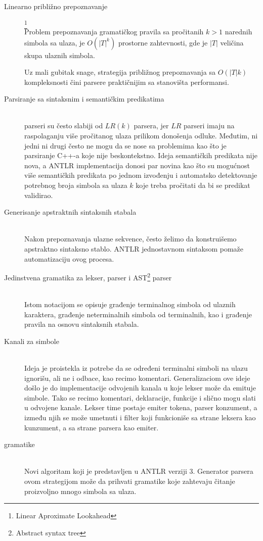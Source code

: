 \begin{description}

	\item[Linearno približno prepoznavanje]\footnote{\eng Linear Aproximate Lookahead} \hfill \\
	Problem prepoznavanja gramatičkog pravila sa pročitanih $k > 1$ narednih simbola sa ulaza, je $O(|T|^{k})$ prostorne zahtevnosti, gde je $|T|$ veličina skupa ulaznih simbola. 
	
	Uz mali gubitak snage, strategija približnog prepoznavanja sa $O(|T|k)$ kompleksnosti čini \LLk parsere praktičnijim sa stanovišta performansi.
	\item[Parsiranje sa sintaksnim i semantičkim predikatima] \hfill \\
	\LLk parseri su često slabiji od $LR(k)$ parsera, jer $LR$ parseri imaju na raspolaganju više pročitanog ulaza prilikom donošenja odluke.
	Međutim, ni jedni ni drugi često ne mogu da se nose sa problemima kao što je parsiranje C++-a koje nije beskontekstno.
	Ideja semantičkih predikata nije nova\cite{attributed-translations}, a ANTLR implementacija donosi par novina kao što su mogućnost više  semantičkih predikata po jednom izvođenju i automatsko detektovanje potrebnog broja simbola sa ulaza $k$ koje treba pročitati da bi se predikat validirao.

	\item[Generisanje apstraktnih sintaksnih stabala] \hfill \\
	Nakon prepoznavanja ulazne sekvence, često želimo da konstruišemo apstraktno sintaksno stablo. ANTLR jednostavnom sintaksom pomaže automatizaciju ovog procesa.
	\item[Jedinstvena gramatika za lekser, parser i AST\footnote{\skr \eng Abstract syntax tree}  parser] \hfill \\
	Istom notacijom se opisuje građenje terminalnog simbola od ulaznih karaktera, građenje neterminalnih simbola od terminalnih, kao i građenje pravila na osnovu sintaksnih stabala.
	\item[Kanali za simbole] \hfill \\
	Ideja je proistekla iz potrebe da se određeni terminalni simboli na ulazu ignorišu, ali ne i odbace, kao recimo komentari. 
Generalizaciom ove ideje došlo je do implementacije odvojenih kanala u koje lekser može da emituje simbole. Tako se recimo komentari, deklaracije, funkcije i slično mogu slati u odvojene kanale. 
Lekser time postaje emiter tokena, parser konzument, a između njih se može umetnuti i filter koji funkcioniše sa strane leksera kao kunzument, a sa strane parsera kao emiter.
	\item [\LLa gramatike] \hfill \\
	Novi algoritam koji je predstavljen u ANTLR verziji 3. Generator parsera ovom strategijom može da prihvati gramatike koje zahtevaju čitanje proizvoljno mnogo simbola sa ulaza.

\end{description}

